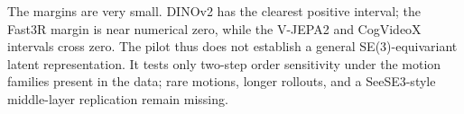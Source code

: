 The margins are very small.  DINOv2 has the clearest positive interval; the
Fast3R margin is near numerical zero, while the V-JEPA2 and CogVideoX intervals
cross zero.  The pilot thus does not establish a general SE(3)-equivariant
latent representation.  It tests only two-step order sensitivity under the
motion families present in the data; rare motions, longer rollouts, and a
SeeSE3-style middle-layer replication remain missing.
